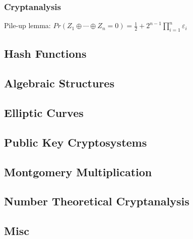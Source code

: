 \documentclass[twoside, 11pt]{article}
\begin{document}
            \subsubsection*{Cryptanalysis}
                Pile-up lemma: $Pr(Z_{1} \oplus \cdots \oplus Z_{n} = 0) = \frac{1}{2} + 2^{n-1}\prod_{i=1}^{n}\varepsilon_{i}$ \\


        \subsection*{Hash Functions}

        \subsection*{Algebraic Structures}

        \subsection*{Elliptic Curves}

        \subsection*{Public Key Cryptosystems}

        \subsection*{Montgomery Multiplication}

        \subsection*{Number Theoretical Cryptanalysis}

        \subsection*{Misc}
\end{document}
